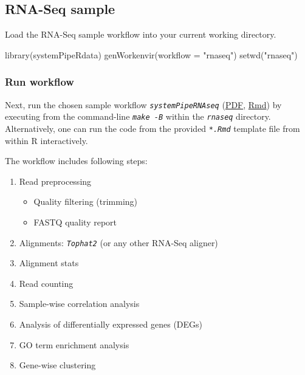 \documentclass[14pt,]{article}
\providecommand{\tightlist}{%
  \setlength{\itemsep}{0pt}\setlength{\parskip}{0pt}}
\newcommand{\hlstr}[1]{\textcolor[rgb]{0.251,0.627,0.251}{#1}}%
\newcommand{\hlstd}[1]{\textcolor[rgb]{0.251,0.251,0.251}{#1}}%
\newcommand{\hlkwc}[1]{\textcolor[rgb]{0.251,0.251,0.251}{#1}}%
\newcommand{\hlkwd}[1]{\textcolor[rgb]{0.878,0.439,0.125}{#1}}%
\newenvironment{Shaded}{\begin{myshaded}}{\end{myshaded}}
\newcommand{\KeywordTok}[1]{\hlkwd{#1}}
\newcommand{\DataTypeTok}[1]{\hlkwc{#1}}
\newcommand{\StringTok}[1]{\hlstr{#1}}
\newcommand{\NormalTok}[1]{\hlstd{#1}}
\begin{document}
\hypertarget{rna-seq-sample}{%
\subsection{RNA-Seq sample}\label{rna-seq-sample}}

Load the RNA-Seq sample workflow into your current working directory.

\begin{Shaded}
\begin{Highlighting}[]
\KeywordTok{library}\NormalTok{(systemPipeRdata)}
\KeywordTok{genWorkenvir}\NormalTok{(}\DataTypeTok{workflow =} \StringTok{"rnaseq"}\NormalTok{)}
\KeywordTok{setwd}\NormalTok{(}\StringTok{"rnaseq"}\NormalTok{)}
\end{Highlighting}
\end{Shaded}

\hypertarget{run-workflow}{%
\subsubsection{Run workflow}\label{run-workflow}}

Next, run the chosen sample workflow \emph{\texttt{systemPipeRNAseq}} (\href{https://github.com/tgirke/systemPipeRdata/blob/master/inst/extdata/workflows/rnaseq/systemPipeRNAseq.pdf?raw=true}{PDF}, \href{https://github.com/tgirke/systemPipeRdata/blob/master/inst/extdata/workflows/rnaseq/systemPipeRNAseq.Rmd}{Rmd}) by executing from the command-line \emph{\texttt{make -B}} within the \emph{\texttt{rnaseq}} directory. Alternatively, one can run the code from the provided \emph{\texttt{*.Rmd}} template file from within R interactively.

The workflow includes following steps:

\begin{enumerate}
\def\labelenumi{\arabic{enumi}.}
\tightlist
\item
  Read preprocessing

  \begin{itemize}
  \tightlist
  \item
    Quality filtering (trimming)
  \item
    FASTQ quality report
  \end{itemize}
\item
  Alignments: \emph{\texttt{Tophat2}} (or any other RNA-Seq aligner)
\item
  Alignment stats
\item
  Read counting
\item
  Sample-wise correlation analysis
\item
  Analysis of differentially expressed genes (DEGs)
\item
  GO term enrichment analysis
\item
  Gene-wise clustering
\end{enumerate}
\end{document}
